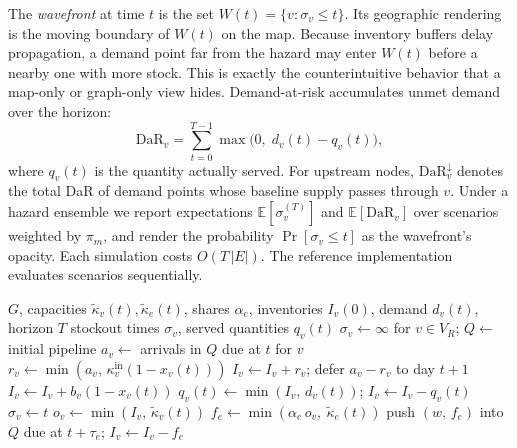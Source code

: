 \documentclass[conference]{IEEEtran}
\begin{document}
The \emph{wavefront} at time $t$ is the set
$W(t)=\{v:\sigma_v\le t\}$. Its geographic rendering is the moving
boundary of $W(t)$ on the map. Because inventory buffers delay
propagation, a demand point far from the hazard may enter $W(t)$ before
a nearby one with more stock. This is exactly the counterintuitive
behavior that a map-only or graph-only view hides. Demand-at-risk
accumulates unmet demand over the horizon:
\begin{equation}
\mathrm{DaR}_v = \sum_{t=0}^{T-1} \max\bigl(0,\; d_v(t)-q_v(t)\bigr),
\end{equation}
where $q_v(t)$ is the quantity actually served. For upstream nodes,
$\mathrm{DaR}^{\downarrow}_v$ denotes the total DaR of demand points
whose baseline supply passes through $v$. Under a hazard ensemble we
report expectations $\mathbb{E}[\sigma_v^{(T)}]$ and $\mathbb{E}[\mathrm{DaR}_v]$
over scenarios weighted by $\pi_m$, and render the probability
$\Pr[\sigma_v\le t]$ as the wavefront's opacity. Each simulation costs
$O(T\,|E|)$. The reference implementation evaluates scenarios
sequentially.

\begin{algorithm}[t]
\caption{Disruption wavefront propagation}
\label{alg:wave}
\begin{algorithmic}[1]
\Require $G$, capacities $\tilde\kappa_v(t),\tilde\kappa_e(t)$,
  shares $\alpha_e$, inventories $I_v(0)$, demand $d_v(t)$, horizon $T$
\Ensure stockout times $\sigma_v$, served quantities $q_v(t)$
\State $\sigma_v\gets\infty$ for $v\in V_R$; $Q\gets$ initial pipeline
    \State $a_v\gets$ arrivals in $Q$ due at $t$ for $v$
    \State $r_v\gets\min(a_v,\,\kappa_v^{\mathrm{in}}(1-x_v(t)))$
    \State $I_v\gets I_v+r_v$; defer $a_v-r_v$ to day $t+1$
     $I_v\gets I_v + b_v(1-x_v(t))$ \EndIf
      \State $q_v(t)\gets\min(I_v,\,d_v(t))$;\; $I_v\gets I_v-q_v(t)$
        $\sigma_v\gets t$ \EndIf
    \Else
      \State $o_v\gets\min(I_v,\,\tilde\kappa_v(t))$
        \State $f_e\gets\min(\alpha_e\,o_v,\ \tilde\kappa_e(t))$
        \State push $(w,\,f_e)$ into $Q$ due at $t+\tau_e$;\;
               $I_v\gets I_v-f_e$
      \EndFor
    \EndIf
  \EndFor
\EndFor
\end{algorithmic}
\end{algorithm}
\end{document}
